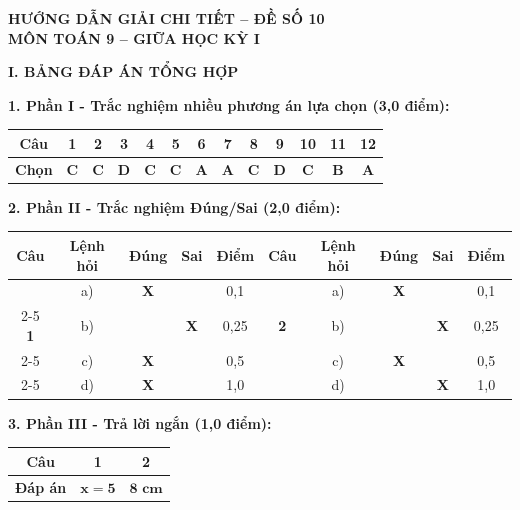 \documentclass[12pt,a4paper]{article}
\begin{document}
\begin{center}
  \textbf{\Large HƯỚNG DẪN GIẢI CHI TIẾT -- ĐỀ SỐ 10}\\
  \textbf{\large MÔN TOÁN 9 -- GIỮA HỌC KỲ I}
\end{center}
\vspace{2mm}

\noindent\textbf{\large I. BẢNG ĐÁP ÁN TỔNG HỢP}

\vspace{1mm}
\noindent\textbf{1. Phần I - Trắc nghiệm nhiều phương án lựa chọn (3,0 điểm):}
\begin{center}
\begin{tabular}{|c|c|c|c|c|c|c|c|c|c|c|c|c|}
\hline
\textbf{Câu} & \textbf{1} & \textbf{2} & \textbf{3} & \textbf{4} & \textbf{5} & \textbf{6} & \textbf{7} & \textbf{8} & \textbf{9} & \textbf{10} & \textbf{11} & \textbf{12} \\
\hline
\textbf{Chọn} & \textbf{C} & \textbf{C} & \textbf{D} & \textbf{C} & \textbf{C} & \textbf{A} & \textbf{A} & \textbf{C} & \textbf{D} & \textbf{C} & \textbf{B} & \textbf{A} \\
\hline
\end{tabular}
\end{center}
\vspace{1mm}

\noindent\textbf{2. Phần II - Trắc nghiệm Đúng/Sai (2,0 điểm):}
\begin{center}
\begin{tabular}{|c|c|c|c|c||c|c|c|c|c|}
\hline
\textbf{Câu} & \textbf{Lệnh hỏi} & \textbf{Đúng} & \textbf{Sai} & \textbf{Điểm} & \textbf{Câu} & \textbf{Lệnh hỏi} & \textbf{Đúng} & \textbf{Sai} & \textbf{Điểm} \\
\hline
 & a) & \textbf{X} & & 0,1 & & a) & \textbf{X} & & 0,1 \\
\cline{2-5}\cline{7-10}
\textbf{1} & b) & & \textbf{X} & 0,25 & \textbf{2} & b) & & \textbf{X} & 0,25 \\
\cline{2-5}\cline{7-10}
 & c) & \textbf{X} & & 0,5 & & c) & \textbf{X} & & 0,5 \\
\cline{2-5}\cline{7-10}
 & d) & \textbf{X} & & 1,0 & & d) & & \textbf{X} & 1,0 \\
\hline
\end{tabular}
\end{center}
\vspace{1mm}

\noindent\textbf{3. Phần III - Trả lời ngắn (1,0 điểm):}
\begin{center}
\begin{tabular}{|c|c|c|}
\hline
\textbf{Câu} & \textbf{1} & \textbf{2} \\
\hline
\textbf{Đáp án} & $\mathbf{x = 5}$ & $\mathbf{8\text{ cm}}$ \\
\hline
\end{tabular}
\end{center}
\vspace{3mm}
\end{document}
